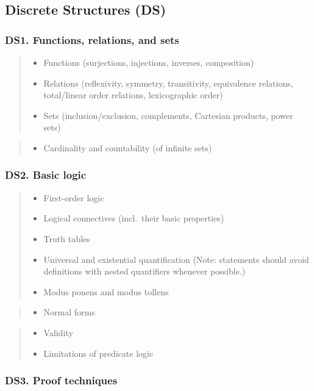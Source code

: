 \documentclass[a4paper,11pt,oneside]{article}
\newcommand{\cmark}{\ding{51}}%
\newcommand{\xmark}{\ding{55}}%
\newcommand{\CC}[1]{#1}
\newcommand{\Cincluded}{{\small\cmark}}
\newcommand{\Cdefine}{{\small\cmark\faFileTextO}}
\newcommand{\Ccodeonly}{{\small\cmark\faFileText}}
\newcommand{\Cnofocus}{{\small\faQuestion}}
\newcommand{\Cexcluded}{{\small\xmark}}
\newcommand{\Iincluded}{\item[\hbox to 1.8em{\Cincluded\hfill}]}
\newcommand{\Idefine}{\item[\hbox to 1.8em{\Cdefine\hfill}]}
\newcommand{\Icodeonly}{\item[\hbox to 1.8em{\Ccodeonly\hfill}]}
\newcommand{\Inofocus}{\item[\hbox to 1.8em{\Cnofocus\hfill}]}
\newcommand{\Iexcluded}{\item[\hbox to 1.8em{\Cexcluded\hfill}]}
\newenvironment{myitemize}{\begin{quote}\begin{itemize}\itemsep 0pt}{\end{itemize}\end{quote}}
\begin{document}
\subsection {Discrete Structures (DS)}%
\label{subsubsec:DS}

    \subsubsection*{DS1. Functions, relations, and sets}

        \begin{myitemize}
        \Idefine\CC{Functions (surjections, injections, inverses, composition)}
        \Idefine\CC{Relations (reflexivity, symmetry, transitivity, equivalence relations,
        total/linear order relations, lexicographic order)}
        \Idefine\CC{Sets (inclusion/exclusion, complements, Cartesian products, power sets)}
        \end{myitemize}

        \begin{myitemize}
        \Iexcluded{Cardinality and countability} (of infinite sets)
        \end{myitemize}
  
    \subsubsection*{DS2. Basic logic}

        \begin{myitemize}
        \Iincluded First-order logic
        \Iincluded\CC{Logical connectives} (incl.\ their basic properties)
        \Iincluded\CC{Truth tables}
        \Iincluded\CC{Universal and existential quantification} (Note: statements should avoid definitions with nested quantifiers whenever possible.)
        \Icodeonly\CC{Modus ponens and modus tollens}
        \end{myitemize}

        \begin{myitemize}
        \Inofocus \CC{Normal forms}
        \end{myitemize}
        
        \begin{myitemize}
        \Iexcluded \CC{Validity}
        \Iexcluded \CC{Limitations of predicate logic}
        \end{myitemize}

    \subsubsection*{DS3. Proof techniques}
\end{document}
